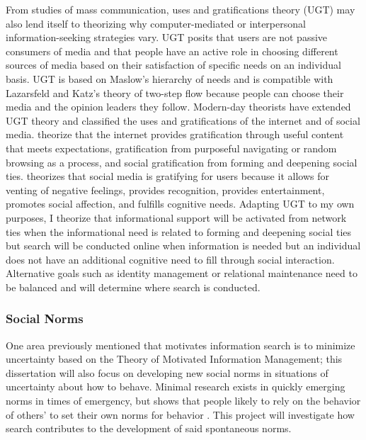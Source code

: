 From studies of mass communication, uses and gratifications theory (UGT)
\citep{blumlerUsesMassCommunications1974, tanMassCommunicationTheories1985}
may also lend itself to theorizing why
computer-mediated or interpersonal information-seeking strategies vary.
UGT posits that users are not passive consumers of media and that people
have an active role in choosing different sources of media based on
their satisfaction of specific needs on an individual basis. UGT is
based on Maslow's \citeyearpar{maslowTheoryHumanMotivation1943}
hierarchy of needs and is compatible with
Lazarsfeld and Katz's theory of two-step flow because people can choose
their media and the opinion leaders they follow. Modern-day theorists
have extended UGT theory and classified the uses and gratifications of
the internet and of social media. \citet{staffordDeterminingUsesGratifications2004}
theorize that the internet provides gratification through useful content
that meets expectations, gratification from purposeful navigating or
random browsing as a process, and social gratification from forming and
deepening social ties. \citet{leungGenerationalDifferencesContent2013} theorizes that 
social media is
gratifying for users because it allows for venting of negative feelings,
provides recognition, provides entertainment, promotes social affection,
and fulfills cognitive needs. Adapting UGT to my own purposes, I
theorize that informational support will be activated from network ties
when the informational need is related to forming and deepening social
ties but search will be conducted online when information is needed but
an individual does not have an additional cognitive need to fill through
social interaction. Alternative goals such as identity management or
relational maintenance \citep{brashersInformationSeekingAvoiding2002}
need to be balanced and will determine where search is conducted.

\subsubsection{Social Norms}

One area previously mentioned that motivates information search is to
minimize uncertainty based on the Theory of Motivated Information
Management; this dissertation will also focus on developing new social
norms in situations of uncertainty about how to behave. Minimal research
exists in quickly emerging norms in times of emergency, but shows that
people likely to rely on the behavior of others' to set their own norms
for behavior \citep{alvarez2018, horneNormsIntegratedFramework2020}. This project will investigate how search contributes to the
development of said spontaneous norms.

